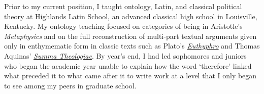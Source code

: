 Prior to my current position, 
I taught ontology, Latin, and classical political theory at Highlands Latin School, 
an advanced classical high school in Louisville, Kentucky. 
My ontology teaching focused on categories of being in Aristotle's \emph{Metaphysics} 
and on the full reconstruction of multi-part textual arguments given only in enthymematic form in classic texts such as Plato's \href{https://jacobarchambault.com/teaching-materials/philosophy-of-human-nature/philosophy-of-human-nature-homework/}{\emph{Euthyphro}} and Thomas Aquinas' \href{https://jacobarchambault.com/teaching-materials/philosophy-of-human-nature/}{\emph{Summa Theologiae}}. 
By year's end, I had led sophomores and juniors who began the academic year unable to explain how the word `therefore' linked what preceded it to what came after it to write work at a level that I only began to see among my peers in graduate school. 
